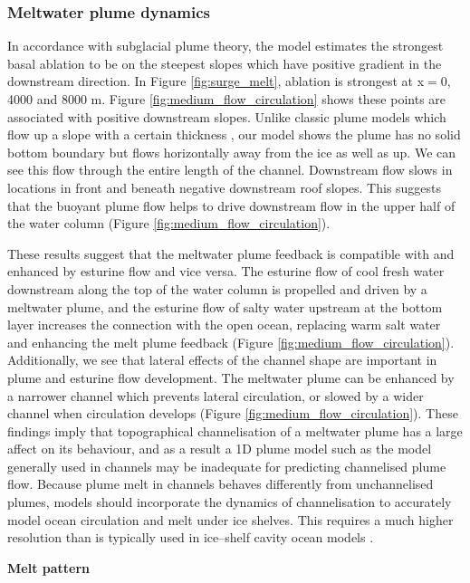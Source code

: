 \subsubsection{Meltwater plume dynamics} 
In accordance with subglacial plume theory, the model estimates the strongest basal ablation to be on the steepest slopes which have  positive gradient in the downstream direction. In Figure \ref{fig:surge_melt}, ablation is strongest at x$=$0, 4000 and 8000 m. Figure \ref{fig:medium_flow_circulation} shows these points are associated with positive downstream slopes. 
Unlike classic plume models which flow up a slope with a certain thickness \citep[e.g.][]{hewitt2020subglacial}, our model shows the plume has no solid bottom boundary but flows horizontally away from the ice as well as up. We can see this flow through the entire length of the channel. Downstream flow slows in locations in front and beneath negative downstream roof slopes. This suggests that the buoyant plume flow helps to drive downstream flow in the upper half of the water column (Figure \ref{fig:medium_flow_circulation}).

These results suggest that the meltwater plume feedback is compatible with and enhanced by esturine flow and vice versa. The esturine flow of cool fresh water downstream along the top of the water column is propelled and driven by a meltwater plume, and the esturine flow of salty water upstream at the bottom layer increases the connection with the open ocean, replacing warm salt water and enhancing the melt plume feedback (Figure \ref{fig:medium_flow_circulation}).
Additionally, we see that lateral effects of the channel shape are important in plume and esturine flow development. The meltwater plume can be enhanced by a narrower channel which prevents lateral circulation, or slowed by a wider channel when circulation develops (Figure \ref{fig:medium_flow_circulation}). 
These findings imply that topographical channelisation of a meltwater plume has a large affect on its behaviour, and as a result a 1D plume model such as the \cite{jenkins2011convection} model generally used in channels may be inadequate for predicting channelised plume flow.
Because plume melt in channels behaves differently from unchannelised plumes, models should incorporate the dynamics of channelisation to accurately model ocean circulation and melt under ice shelves. This requires a much higher resolution than is typically used in ice--shelf cavity ocean models \cite[e.g.][]{holland2003modelling}. 


\textbf{Melt pattern}

